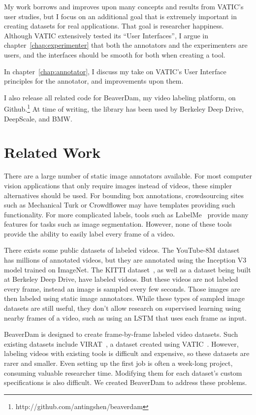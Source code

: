 My work borrows and improves upon many concepts and results from VATIC's user studies, but I focus on an additional goal that is extremely important in creating datasets for real applications. That goal is researcher happiness.
Although VATIC extensively tested its ``User Interfaces'', I argue in chapter~\ref{chap:experimenter} that both the annotators and the experimenters are users, and the interfaces should be smooth for both when creating a tool.

In chapter~\ref{chap:annotator}, I discuss my take on VATIC's User Interface principles for the annotator, and improvements upon them.

I also release all related code for BeaverDam, my video labeling platform, on Github.\footnote{http://github.com/antingshen/beaverdam} At time of writing, the library has been used by Berkeley Deep Drive, DeepScale, and BMW.

\section*{Related Work}
\label{sec:related}

There are a large number of static image annotators available.
For most computer vision applications that only require images instead of videos, these simpler alternatives should be used.
For bounding box annotations, crowdsourcing sites such as Mechanical Turk or Crowdflower may have templates providing such functionality.
For more complicated labels, tools such as LabelMe~\cite{LabelMe} provide many features for tasks such as image segmentation.
However, none of these tools provide the ability to easily label every frame of a video.

There exists some public datasets of labeled videos.
The YouTube-8M dataset~\cite{YouTube-8M} has millions of annotated videos, but they are annotated using the Inception V3 model trained on ImageNet.
The KITTI dataset~\cite{KITTI}, as well as a dataset being built at Berkeley Deep Drive, have labeled videos.
But these videos are not labeled every frame, instead an image is sampled every few seconds.
Those images are then labeled using static image annotators.
While these types of sampled image datasets are still useful, they don't allow research on supervised learning using nearby frames of a video, such as using an LSTM that uses each frame as input.

BeaverDam is designed to create frame-by-frame labeled video datasets.
Such existing datasets include VIRAT~\cite{virat}, a dataset created using VATIC~\cite{Vatic}.
However, labeling videos with existing tools is difficult and expensive, so these datasets are rarer and smaller.
Even setting up the first job is often a week-long project, consuming valuable researcher time.
Modifying them for each dataset's custom specifications is also difficult.
We created BeaverDam to address these problems.

